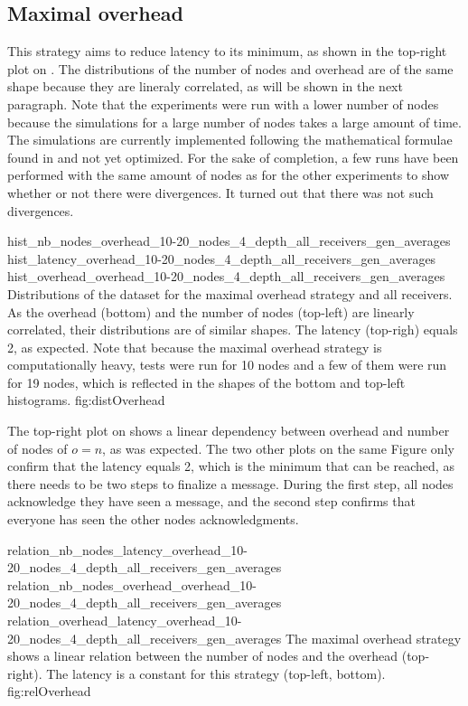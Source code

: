\FloatBarrier
\subsection{Maximal overhead}
This strategy aims to reduce latency to its minimum, as shown in the
top-right plot on . The distributions of the number
of nodes and overhead are of the same shape because they are lineraly
correlated, as will be shown in the next paragraph. 
Note that the experiments were run with a lower number of nodes because the
simulations for a large number of nodes takes a large amount of time. The
simulations are currently implemented following the mathematical formulae found
in \cite{abstractCBC} and not yet optimized. For the sake of completion, a few runs
have been performed with the same amount of nodes as for the other experiments
to show whether or not there were divergences. It turned out that there was not
such divergences. 

\triplefigure
    {hist_nb_nodes_overhead_10-20_nodes_4_depth_all_receivers_gen_averages}
    {hist_latency_overhead_10-20_nodes_4_depth_all_receivers_gen_averages}
    {hist_overhead_overhead_10-20_nodes_4_depth_all_receivers_gen_averages}
    {Distributions of the dataset for the maximal overhead strategy and all
    receivers. As the overhead (bottom) and the number of nodes (top-left) are
    linearly correlated, their distributions are of similar shapes. The
    latency (top-righ) equals 2, as expected. Note that because the maximal
    overhead strategy is computationally heavy, tests were run for 10 nodes and
    a few of them were run for 19 nodes, which is reflected in the shapes of the
    bottom and top-left histograms.}
    {fig:distOverhead}

The top-right plot on  shows a linear dependency between
overhead and number of nodes of \(o = n\), as was expected.  The two other plots
on the same Figure only confirm that the latency equals 2, which is the minimum
that can be reached, as there needs to be two steps to finalize a message.
During the first step, all nodes acknowledge they have seen a message, and the
second step confirms that everyone has seen the other nodes acknowledgments.

\triplefigure
    {relation_nb_nodes_latency_overhead_10-20_nodes_4_depth_all_receivers_gen_averages}
    {relation_nb_nodes_overhead_overhead_10-20_nodes_4_depth_all_receivers_gen_averages}
    {relation_overhead_latency_overhead_10-20_nodes_4_depth_all_receivers_gen_averages}
    {The maximal overhead  strategy shows a linear relation between the number of
    nodes and the overhead (top-right). The latency is a constant for this
    strategy (top-left, bottom).}
    {fig:relOverhead}


